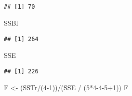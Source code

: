 \documentclass[
]{book}
\newenvironment{Shaded}{\begin{snugshade}}{\end{snugshade}}
\newcommand{\DecValTok}[1]{\textcolor[rgb]{0.00,0.00,0.81}{#1}}
\newcommand{\FunctionTok}[1]{\textcolor[rgb]{0.00,0.00,0.00}{#1}}
\newcommand{\NormalTok}[1]{#1}
\newcommand{\OtherTok}[1]{\textcolor[rgb]{0.56,0.35,0.01}{#1}}
\newcommand{\SpecialCharTok}[1]{\textcolor[rgb]{0.00,0.00,0.00}{#1}}
\begin{document}
\begin{Shaded}
\end{Shaded}

\begin{verbatim}
## [1] 70
\end{verbatim}

\begin{Shaded}
\begin{Highlighting}[]
\NormalTok{SSBl}
\end{Highlighting}
\end{Shaded}

\begin{verbatim}
## [1] 264
\end{verbatim}

\begin{Shaded}
\begin{Highlighting}[]
\NormalTok{SSE}
\end{Highlighting}
\end{Shaded}

\begin{verbatim}
## [1] 226
\end{verbatim}

\begin{Shaded}
\begin{Highlighting}[]
\NormalTok{F }\OtherTok{\textless{}{-}}\NormalTok{ (SSTr}\SpecialCharTok{/}\NormalTok{(}\DecValTok{4{-}1}\NormalTok{))}\SpecialCharTok{/}\NormalTok{(SSE }\SpecialCharTok{/}\NormalTok{ (}\DecValTok{5}\SpecialCharTok{*}\DecValTok{4{-}4{-}5}\SpecialCharTok{+}\DecValTok{1}\NormalTok{))}
\NormalTok{F}
\end{Highlighting}
\end{Shaded}
\end{document}
